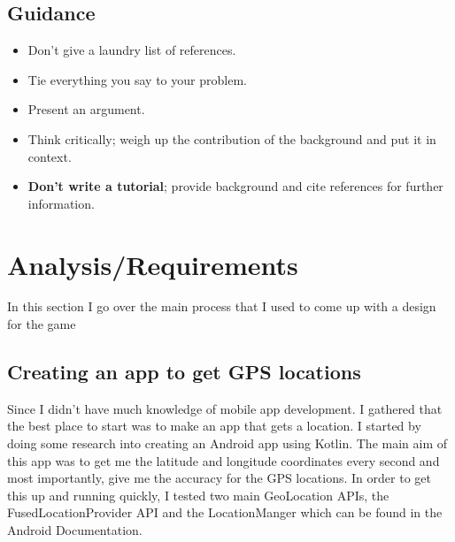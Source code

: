 \documentclass{l4proj}
\begin{document}
\section{Guidance}
\begin{itemize}    
    \item
      Don't give a laundry list of references.
    \item
      Tie everything you say to your problem.
    \item
      Present an argument.
    \item Think critically; weigh up the contribution of the background and put it in context.    
    \item
      \textbf{Don't write a tutorial}; provide background and cite
      references for further information.
\end{itemize}

\chapter{Analysis/Requirements}
In this section I go over the main process that I used to come up with a design for the game

\section{Creating an app to get GPS locations}
Since I didn't have much knowledge of mobile app development. I gathered that the best place to start was to make an app that gets a location. 
I started by doing some research into creating an Android app using Kotlin. The main aim of this app was to get me the latitude and longitude coordinates every second and most importantly, give me the accuracy for the GPS locations. 
In order to get this up and running quickly, I tested two main GeoLocation APIs, the FusedLocationProvider API and the LocationManger which can be found in the Android Documentation.
\end{document}
